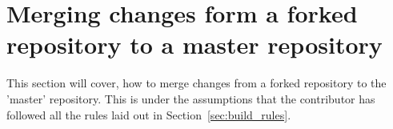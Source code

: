 \section{Merging changes form a forked repository to a master repository\label{sec:pull_requests}}
This section will cover, how to merge changes from a forked repository to the 'master' repository. This is under the assumptions that the contributor has followed all the rules laid out in Section~\ref{sec:build_rules}.
